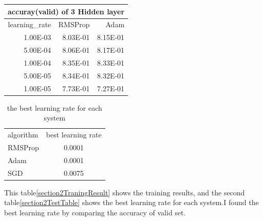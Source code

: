 \documentclass{article}
\begin{document}
\begin{table}[htbp]\label{section2TraningResult}
  \centering
    \begin{tabular}{|r|r|r|}
    \toprule
    \multicolumn{3}{|p{15em}}{accuray(valid) of 3 Hidden layer} \\
    \midrule
    \multicolumn{1}{|r|}{\multirow{2}[2]{*}{learning\_rate}} & \multicolumn{1}{r|}{\multirow{2}[2]{*}{RMSProp }} & \multicolumn{1}{r|}{\multirow{2}[2]{*}{Adam }} \\
          &       &  \\
    \midrule
    \multirow{2}[2]{*}{1.00E-03} & \multirow{2}[2]{*}{8.03E-01} & \multirow{2}[2]{*}{8.15E-01} \\
          &       &  \\
    \midrule
    \multirow{2}[2]{*}{5.00E-04} & \multirow{2}[2]{*}{8.06E-01} & \multirow{2}[2]{*}{8.17E-01} \\
          &       &  \\
    \midrule
    \multirow{2}[2]{*}{1.00E-04} & \multirow{2}[2]{*}{8.35E-01} & \multirow{2}[2]{*}{8.33E-01} \\
          &       &  \\
    \midrule
    \multirow{2}[2]{*}{5.00E-05} & \multirow{2}[2]{*}{8.34E-01} & \multirow{2}[2]{*}{8.32E-01} \\
          &       &  \\
    \midrule
    \multirow{2}[2]{*}{1.00E-05} & \multirow{2}[2]{*}{7.73E-01} & \multirow{2}[2]{*}{7.27E-01} \\
          &       &  \\
    \bottomrule
    \end{tabular}%
  \label{tab:addlabel}%
\end{table}%

\begin{table}[htbp]\label{section2TestTable}
	\centering
	\caption{the best learning rate for each system}
	\begin{tabular}{lc}
		algorithm & best learning rate  \\
		RMSProp & 0.0001 \\
		Adam  & 0.0001 \\
		SGD   & 0.0075 \\
	\end{tabular}%
	\label{tab:addlabel}%
\end{table}%

This table\ref{section2TraningResult} shows the training results, and the second table\ref{section2TestTable} shows the best learning rate for each system.I found the best learning rate by comparing the accuracy of valid set.
\end{document}
